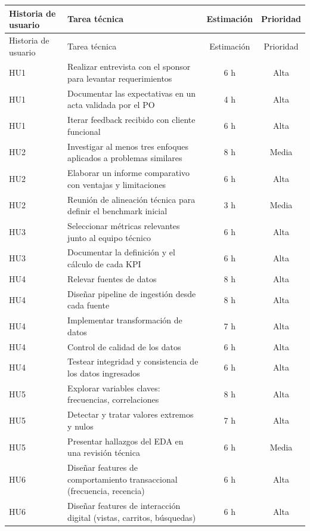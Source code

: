 \documentclass[
11pt, %
]{charter}
\begin{document}
\begin{longtable}{|p{2cm}|p{10cm}|c|c|}
\hline
\rowcolor[HTML]{C0C0C0}
Historia de usuario & Tarea técnica & Estimación & Prioridad \\ \hline
\endfirsthead

\hline
\rowcolor[HTML]{C0C0C0}
Historia de usuario & Tarea técnica & Estimación & Prioridad \\ \hline
\endhead

HU1 & Realizar entrevista con el sponsor para levantar requerimientos & 6 h & Alta \\ \hline
HU1 & Documentar las expectativas en un acta validada por el PO & 4 h & Alta \\ \hline
HU1 & Iterar feedback recibido con cliente funcional & 6 h & Alta \\ \hline
HU2 & Investigar al menos tres enfoques aplicados a problemas similares & 8 h & Media \\ \hline
HU2 & Elaborar un informe comparativo con ventajas y limitaciones & 6 h & Alta \\ \hline
HU2 & Reunión de alineación técnica para definir el benchmark inicial & 3 h & Media \\ \hline
HU3 & Seleccionar métricas relevantes junto al equipo técnico & 6 h & Alta \\ \hline
HU3 & Documentar la definición y el cálculo de cada KPI & 6 h & Alta \\ \hline
HU4 & Relevar fuentes de datos & 8 h & Alta \\ \hline
HU4 & Diseñar pipeline de ingestión desde cada fuente & 8 h & Alta \\ \hline
HU4 & Implementar transformación de datos  & 7 h & Alta \\ \hline
HU4 & Control de calidad de los datos & 6 h & Alta \\ \hline
HU4 & Testear integridad y consistencia de los datos ingresados & 6 h & Alta \\ \hline
HU5 & Explorar variables claves: frecuencias, correlaciones & 8 h & Alta \\ \hline
HU5 & Detectar y tratar valores extremos y nulos & 7 h & Alta \\ \hline
HU5 & Presentar hallazgos del EDA en una revisión técnica & 6 h & Media \\ \hline
HU6 & Diseñar features de comportamiento transaccional (frecuencia, recencia) & 6 h & Alta \\ \hline
HU6 & Diseñar features de interacción digital (vistas, carritos, búsquedas) & 6 h & Alta \\ \hline

\end{longtable}
\end{document}
